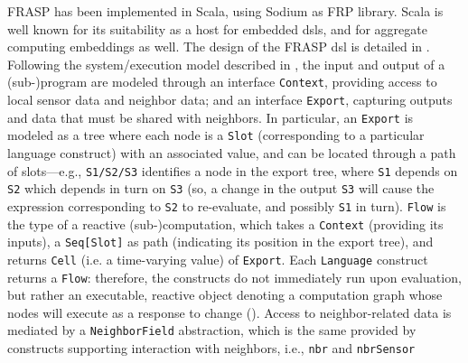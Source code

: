 FRASP has been implemented in Scala, using Sodium as FRP library. Scala is well known for its suitability as a host for embedded \ac{dsl}s, and for aggregate computing embeddings as well. The design of the FRASP \ac{dsl} is
detailed in . Following the system/execution model described in , the input and output of a (sub-)program are modeled through an interface \texttt{Context}, providing access to local sensor data and neighbor data; and an interface \texttt{Export}, capturing outputs and data that must be shared with neighbors. In particular, an \texttt{Export} is modeled as a tree where each node is a \texttt{Slot} (corresponding to a particular language construct) with an associated value, and can be located through a path of slots—e.g., \texttt{S1/S2/S3} identifies a node in the export tree, where \texttt{S1} depends on \texttt{S2} which depends in turn on \texttt{S3} (so, a change in the output \texttt{S3} will cause the expression corresponding to \texttt{S2} to re-evaluate, and possibly \texttt{S1} in turn). \texttt{Flow} is the type of a reactive (sub-)computation, which takes a \texttt{Context} (providing its inputs), a \texttt{Seq[Slot]} as path (indicating its position in the export tree), and returns \texttt{Cell} (i.e. a time-varying value) of \texttt{Export}. Each \texttt{Language} construct returns a \texttt{Flow}: therefore, the constructs do not immediately run upon evaluation, but rather an executable, reactive object denoting a computation graph whose nodes will execute as a response to change (). Access to neighbor-related data is mediated by a \texttt{NeighborField} abstraction, which is the same provided by constructs supporting interaction with neighbors, i.e., \texttt{nbr} and \texttt{nbrSensor} 

